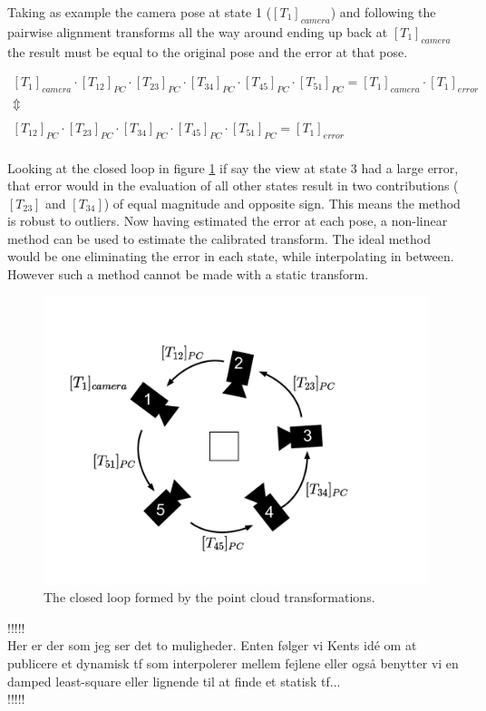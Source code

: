 \noindent Taking as example the camera pose at state 1 ($ [T_1]_{camera} $) and following the pairwise alignment transforms all the way around ending up back at $ [T_1]_{camera} $ the result must be equal to the original pose and the error at that pose.

\begin{equation}
\begin{matrix}
[T_{1}]_{camera} \cdot [T_{12}]_{PC} \cdot [T_{23}]_{PC} \cdot [T_{34}]_{PC} \cdot [T_{45}]_{PC} \cdot [T_{51}]_{PC} = [T_{1}]_{camera} \cdot [T_{1}]_{error}
\\ 
\Updownarrow \\ 
\\ 
[T_{12}]_{PC} \cdot [T_{23}]_{PC} \cdot [T_{34}]_{PC} \cdot [T_{45}]_{PC} \cdot [T_{51}]_{PC} = [T_{1}]_{error}
\end{matrix}
\end{equation}\\ 

\noindent Looking at the closed loop in figure \ref{fig:new_calibration} if say the view at state 3 had a large error, that error would in the evaluation of all other states result in two contributions ($ [T_{23}] $ and $ [T_{34}] $) of equal magnitude and opposite sign. This means the method is robust to outliers. Now having estimated the error at each pose, a non-linear method can be used to estimate the calibrated transform. The ideal method would be one eliminating the error in each state, while interpolating in between. However such a method cannot be made with a static transform.


\begin{figure}[htb]
	\begin{center}
		\includegraphics[width=\textwidth,trim=0 0 0 0]{graphics/03_calibration/new_calibration.pdf}%
		\caption{The closed loop formed by the point cloud transformations.}\label{fig:new_calibration}
	\end{center}
\end{figure}

!!!!!\\
Her er der som jeg ser det to muligheder. Enten følger vi Kents idé om at publicere et dynamisk tf som interpolerer mellem fejlene eller også benytter vi en damped least-square eller lignende til at finde et statisk tf...\\
!!!!!\\
 



